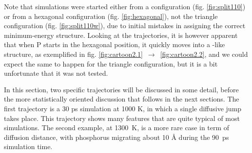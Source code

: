 \documentclass[11pt,bibliography=totoc,index=totoc]{scrbook}   %
\begin{document}
Note that simulations were started either from a  configuration (fig. \ref{fig:split110}) 
or from a hexagonal configuration (fig. \ref{fig:hexagonal}), 
not the triangle configuration (fig. \ref{fig:split110w}), due to initial mistakes in assigning the correct minimum-energy structure. 
Looking at the trajectories, it is however apparent that when P starts in the hexagonal position, 
it quickly moves into a -like structure, as exemplified in fig. \ref{fig:cartoon2.1}~$\to$~\ref{fig:cartoon2.2},
and we could expect the same to happen for the triangle configuration, but it is a bit unfortunate that it was not tested.

In this section, two specific trajectories will be discussed in some detail, 
before the more statistically oriented discussion that follows in the next sections.
The first trajectory is a 30 ps simulation at 1000 K, in which a single diffusive jump takes place. 
This trajectory shows many features that are quite typical of most simulations.
The second example, at 1300~K, is a more rare case in term of diffusion distance, with phosphorus migrating about 10 Å during the 90~ps simulation time.
\end{document}
